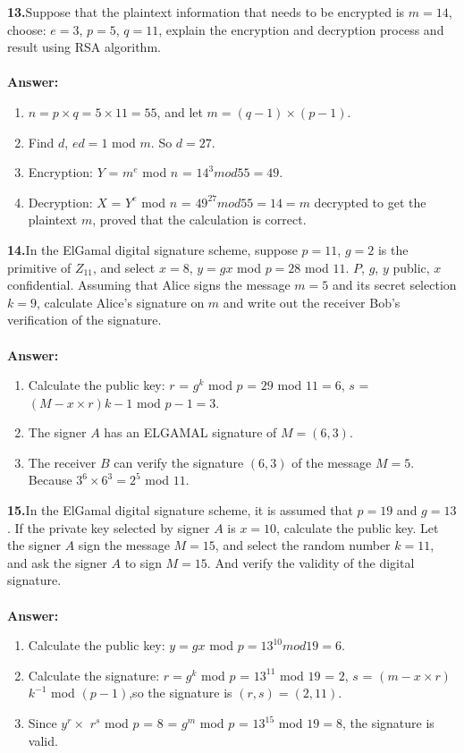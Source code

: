 \documentclass[paper=a4, fontsize=11pt]{scrartcl} %
\numberwithin{equation}{section} %
\numberwithin{figure}{section} %
\numberwithin{table}{section} %
\begin{document}
\textbf{13.}Suppose that the plaintext information that needs to be encrypted is $m = 14$, choose: $e = 3$, $p = 5$, $q = 11$, explain the encryption and decryption process and result using RSA algorithm.
\\
\\
\textbf{Answer:}
\begin{enumerate}
\item $n = p \times q = 5 \times 11 = 55$, and let $m = (q-1) \times (p-1)$.
\item Find $d$, $ed = 1$ mod $m$. So $d = 27$.
\item Encryption: $Y$ = $m ^ e$ mod $n$ = $14 ^ 3 mod 55 = 49$.
\item Decryption: $X$ = $Y ^ e$ mod $n$ = $49 ^ 27 mod 55 = 14 = m$ decrypted to get the plaintext $m$, proved that the calculation is correct.
\end{enumerate}

\textbf{14.}In the ElGamal digital signature scheme, suppose $p = 11$, $g = 2$ is the primitive of $Z_{11}$, and select $x = 8$, $y = gx$ mod $p = 28$ mod $11$. $P$, $g$, $y$ public, $x$ confidential. Assuming that Alice signs the message $m = 5$ and its secret selection $k = 9$, calculate Alice's signature on $m$ and write out the receiver Bob's verification of the signature.
\\
\\
\textbf{Answer:}
\begin{enumerate}
\item Calculate the public key: $r$ = $g ^ k$ mod $p$ = $29$ mod $11 = 6$, $s$ = $(M-x \times r) k-1$ mod $p-1 =3$.
\item The signer $A$ has an ELGAMAL signature of $M = (6,3)$.
\item The receiver $B$ can verify the signature $(6,3)$ of the message $M = 5$. Because $3^6 \times 6^3 =2^5$ mod $11$.
\end{enumerate}

\textbf{15.}In the ElGamal digital signature scheme, it is assumed that $p = 19$ and $g = 13$. If the private key selected by signer $A$ is $x = 10$, calculate the public key. Let the signer $A$ sign the message $M = 15$, and select the random number $k = 11$, and ask the signer $A$ to sign $M = 15$. And verify the validity of the digital signature.
\\
\\
\textbf{Answer:}
\begin{enumerate}
\item Calculate the public key: $y = gx$ mod $p = 13^10 mod 19 = 6$.
\item Calculate the signature: $r=g^k$ mod $p$ = $13^11$ mod $19$ = $2$, $s$ = $(m-x \times r)$ $k^{-1}$ mod $(p-1)$,so the signature is $(r,s)=(2, 11)$.
\item Since $y ^ r \times $ $r^s$ mod $p$ = 8 = $g^m$ mod $p$ = $13^{15}$ mod $19 = 8$, the signature is valid.
\end{enumerate}
\end{document}
